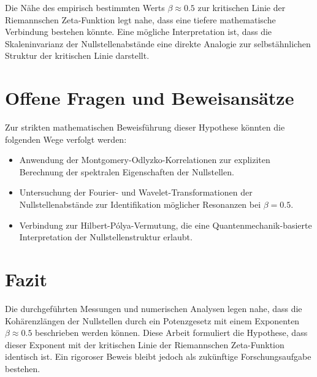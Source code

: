 \documentclass[a4paper,11pt]{article}
\begin{document}
Die Nähe des empirisch bestimmten Werts \( \beta \approx 0.5 \) zur kritischen Linie der Riemannschen Zeta-Funktion legt nahe, dass eine tiefere mathematische Verbindung bestehen könnte. Eine mögliche Interpretation ist, dass die Skaleninvarianz der Nullstellenabstände eine direkte Analogie zur selbstähnlichen Struktur der kritischen Linie darstellt.

\section{Offene Fragen und Beweisansätze}

Zur strikten mathematischen Beweisführung dieser Hypothese könnten die folgenden Wege verfolgt werden:
\begin{itemize}
    \item Anwendung der Montgomery-Odlyzko-Korrelationen zur expliziten Berechnung der spektralen Eigenschaften der Nullstellen.
    \item Untersuchung der Fourier- und Wavelet-Transformationen der Nullstellenabstände zur Identifikation möglicher Resonanzen bei \( \beta = 0.5 \).
    \item Verbindung zur Hilbert-Pólya-Vermutung, die eine Quantenmechanik-basierte Interpretation der Nullstellenstruktur erlaubt.
\end{itemize}

\section{Fazit}

Die durchgeführten Messungen und numerischen Analysen legen nahe, dass die Kohärenzlängen der Nullstellen durch ein Potenzgesetz mit einem Exponenten \( \beta \approx 0.5 \) beschrieben werden können. Diese Arbeit formuliert die Hypothese, dass dieser Exponent mit der kritischen Linie der Riemannschen Zeta-Funktion identisch ist. Ein rigoroser Beweis bleibt jedoch als zukünftige Forschungsaufgabe bestehen.
\end{document}
